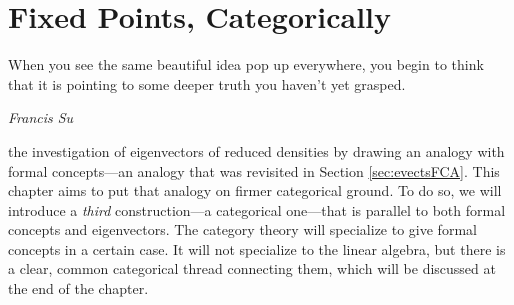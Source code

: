 \chapter{Fixed Points, Categorically}\label{ch:categorytheory}

\epigraph{When you see the same beautiful idea pop up everywhere, you begin to think that it is pointing to some deeper truth you haven't yet grasped.}{\textit{Francis Su \cite{su2020}}}

  the investigation of eigenvectors of reduced densities by drawing an analogy with formal concepts---an analogy that was revisited in Section \ref{sec:evectsFCA}. This chapter aims to put that analogy on firmer categorical ground. To do so, we will introduce a \textit{third} construction---a categorical one---that is parallel to both formal concepts and eigenvectors. The category theory will specialize to give formal concepts in a certain case. It will not specialize to the linear algebra, but there is a clear, common categorical thread connecting them, which will be discussed at the end of the chapter.

